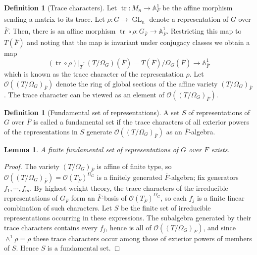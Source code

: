 \documentclass[11pt,a4paper]{article}
\theoremstyle{definition}
\newtheorem{D}[shared]{Definition}
\theoremstyle{plain}
\newtheorem{Le}[shared]{Lemma}
\theoremstyle{remark}
\theoremstyle{plain}
\DeclareMathOperator{\tr}{tr}
\DeclareMathOperator{\GL}{GL}
\begin{document}
\begin{D}[Trace characters]
    Let $\tr: M_n \xrightarrow[]{} \mathbb{A}^1_F$ be the affine morphism sending a matrix to its trace. Let $\rho: G \xrightarrow[]{} \GL_n$ denote a representation of $G$ over $\overline{F}$. Then, there is an affine morphism $\tr \circ \rho: G_{\overline{F}} \xrightarrow[]{} \mathbb{A}^1_{\overline{F}}$. Restricting this map to $T(\overline{F})$ and noting that the map is invariant under conjugacy classes we obtain a map
    $$(\tr \circ \rho)|_T: (T/\Omega_G)(\overline{F}) = T(\overline{F})/\Omega_G(\overline{F}) \xrightarrow[]{} \mathbb{A}^1_{\overline{F}}$$
    which is known as the trace character of the representation $\rho$. Let $\mathcal{O}((T/\Omega_G)_{\overline{F}})$ denote the ring of global sections of the affine variety $(T/ \Omega_G)_{\overline{F}}$. The trace character can be viewed as an element of $\mathcal{O}((T / \Omega_G)_{\overline{F}})$.
\end{D}

\begin{D}[Fundamental set of representations]
    A set $S$ of representations of $G$ over $\overline{F}$ is called a fundamental set if the trace characters of all exterior powers of the representations in $S$ generate $\mathcal{O}((T / \Omega_G)_{\overline{F}})$ as an $\overline{F}$-algebra.
\end{D}

\begin{Le}\label{fundamentalsetexists}
    A finite fundamental set of representations of $G$ over $\overline{F}$ exists.
\end{Le}
\begin{proof}
    The variety $(T/\Omega_G)_{\overline{F}}$ is affine of finite type, so $\mathcal{O}((T/\Omega_G)_{\overline{F}}) = \mathcal{O}(T_{\overline{F}})^{\Omega_G}$ is a finitely generated $\overline{F}$-algebra; fix generators $f_1, \cdots, f_m$. By highest weight theory, the trace characters of the irreducible representations of $G_{\overline{F}}$ form an $\overline{F}$-basis of $\mathcal{O}(T_{\overline{F}})^{\Omega_G}$, so each $f_j$ is a finite linear combination of such characters. Let $S$ be the finite set of irreducible representations occurring in these expressions. The subalgebra generated by their trace characters contains every $f_j$, hence is all of $\mathcal{O}((T/\Omega_G)_{\overline{F}})$, and since $\wedge^1 \rho = \rho$ these trace characters occur among those of exterior powers of members of $S$. Hence $S$ is a fundamental set.
\end{proof}
\end{document}
